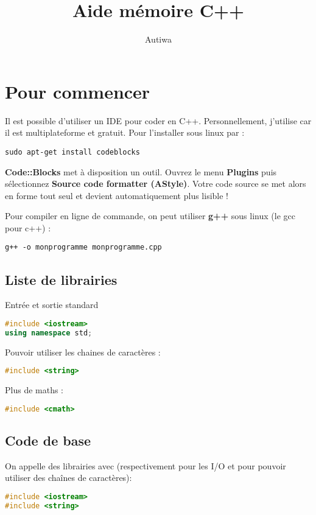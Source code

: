 \documentclass[a4paper,twoside]{article}
\title{Aide mémoire C++}
\author{Autiwa}
\begin{document}
\tableofcontents

\clearpage

\section{Pour commencer}
Il est possible d'utiliser un IDE pour coder en C++. Personnellement, j'utilise  car il est 
multiplateforme et gratuit. Pour l'installer sous linux par :
\begin{verbatim}
sudo apt-get install codeblocks
\end{verbatim}

\begin{remarque}
\textbf{Code::Blocks} met à disposition un outil. Ouvrez le menu \textbf{Plugins} puis sélectionnez \textbf{Source code 
formatter 
(AStyle)}. Votre code source se met alors en forme tout seul et devient automatiquement plus lisible !
\end{remarque}


Pour compiler en ligne de commande, on peut utiliser \textbf{g++} sous linux (le gcc pour c++) :
\begin{verbatim}
g++ -o monprogramme monprogramme.cpp
\end{verbatim}

\subsection{Liste de librairies}
Entrée et sortie standard
\begin{lstlisting}[language=C++]
#include <iostream>
using namespace std;
\end{lstlisting}

Pouvoir utiliser les chaines de caractères :
\begin{lstlisting}[language=C++]
#include <string>
\end{lstlisting}

Plus de maths :
\begin{lstlisting}[language=C++]
#include <cmath>
\end{lstlisting}


\subsection{Code de base}
On appelle des librairies avec (respectivement pour les I/O et pour pouvoir utiliser des chaînes de caractères):
\begin{lstlisting}[language=C++]
#include <iostream>
#include <string>
\end{lstlisting}
\end{document}
